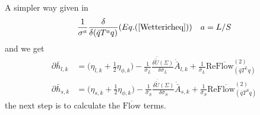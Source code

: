 \documentclass[12pt]{article}
\begin{document}
A simpler way given in \cite{}
\begin{align}
\frac{{1}}{\sigma^a}\frac{{\delta}}{\delta(\bar q T^a q)}(Eq. (\ref{Wettericheq})) \quad a=L/S
\end{align}
and we get
\begin{align}
\partial \bar h_{l,k}&=\bigg( \eta_{l,k} +\frac{1}{2}\eta_{\phi,k}\bigg )-\frac{1}{\bar \sigma_L} \frac{\delta \bar{\tilde U}(\Sigma)}{\delta \bar \sigma_L}\dot{\bar A}_{l,k}+\frac{1}{\bar \sigma_L} \text{Re} \overline{  \text{Flow} }_{(\bar q T^L q)}^{(2)}\\
\partial \bar h_{s,k}&=\bigg( \eta_{s,k} +\frac{1}{2}\eta_{\phi,k}\bigg )-\frac{1}{\bar \sigma_S} \frac{\delta \bar{\tilde U}(\Sigma)}{\delta \bar \sigma_S}\dot{\bar A}_{s,k}+\frac{1}{\bar \sigma_S} \text{Re} \overline{  \text{Flow} }_{(\bar q T^S q)}^{(2)} \label{Yukawa_eq}
\end{align}
the next step is to calculate the $\overline{\text{Flow}}$ terms.
\end{document}

